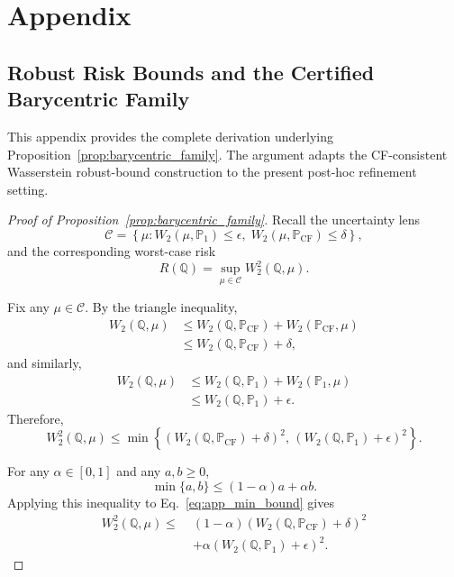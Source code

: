\appendix
\section{Appendix}
\subsection{Robust Risk Bounds and the Certified Barycentric Family}
\label{app:barycentric_bound}

This appendix provides the complete derivation underlying
Proposition~\ref{prop:barycentric_family}. The argument adapts the
CF-consistent Wasserstein robust-bound construction to the present
post-hoc refinement setting.

\begin{proof}[Proof of Proposition~\ref{prop:barycentric_family}]
Recall the uncertainty lens
\begin{equation}
\mathcal{C}
=
\left\{
\mu:
W_2(\mu,\mathbb{P}_1)\le \epsilon,\;
W_2(\mu,\mathbb{P}_{\mathrm{CF}})\le \delta
\right\},
\end{equation}
and the corresponding worst-case risk
\begin{equation}
R(\mathbb{Q})
=
\sup_{\mu\in\mathcal{C}}
W_2^2(\mathbb{Q},\mu).
\end{equation}

Fix any $\mu\in\mathcal{C}$. By the triangle inequality,
\begin{align}
W_2(\mathbb{Q},\mu)
&\le
W_2(\mathbb{Q},\mathbb{P}_{\mathrm{CF}})
+
W_2(\mathbb{P}_{\mathrm{CF}},\mu)
\nonumber\\
&\le
W_2(\mathbb{Q},\mathbb{P}_{\mathrm{CF}})+\delta,
\label{eq:app_cf_triangle}
\end{align}
and similarly,
\begin{align}
W_2(\mathbb{Q},\mu)
&\le
W_2(\mathbb{Q},\mathbb{P}_1)
+
W_2(\mathbb{P}_1,\mu)
\nonumber\\
&\le
W_2(\mathbb{Q},\mathbb{P}_1)+\epsilon.
\label{eq:app_target_triangle}
\end{align}
Therefore,
\begin{equation}
W_2^2(\mathbb{Q},\mu)
\le
\min\left\{
\left(W_2(\mathbb{Q},\mathbb{P}_{\mathrm{CF}})+\delta\right)^2,\,
\left(W_2(\mathbb{Q},\mathbb{P}_1)+\epsilon\right)^2
\right\}.
\label{eq:app_min_bound}
\end{equation}

For any $\alpha\in[0,1]$ and any $a,b\ge 0$,
\begin{equation}
\min\{a,b\}
\le
(1-\alpha)a+\alpha b.
\end{equation}
Applying this inequality to Eq.~\ref{eq:app_min_bound} gives
\begin{align}
W_2^2(\mathbb{Q},\mu)
\le\;&
(1-\alpha)
\left(
W_2(\mathbb{Q},\mathbb{P}_{\mathrm{CF}})+\delta
\right)^2
\nonumber\\
&+
\alpha
\left(
W_2(\mathbb{Q},\mathbb{P}_1)+\epsilon
\right)^2.
\label{eq:app_convex_bound}
\end{align}


\end{proof}
